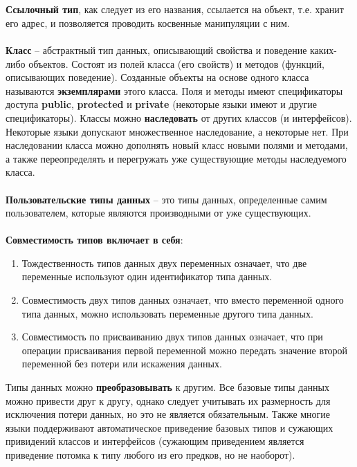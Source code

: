 \documentclass[a4paper, 12pt]{report}
\numberwithin{equation}{section}
\begin{document}
	\\\\
	\textbf{Ссылочный тип}, как следует из его названия, ссылается на объект, т.е. хранит его адрес, и позволяется проводить косвенные манипуляции с ним. 
	\\\\
	\textbf{Класс} -- абстрактный тип данных, описывающий свойства и поведение каких-либо объектов. Состоят из полей класса (его свойств) и методов (функций, описывающих поведение). Созданные объекты на основе одного класса называются \textbf{экземплярами} этого класса. Поля и методы имеют спецификаторы доступа \textbf{public}, \textbf{protected} и \textbf{private} (некоторые языки имеют и другие спецификаторы). Классы можно \textbf{наследовать} от других классов (и интерфейсов). Некоторые языки допускают множественное наследование, а некоторые нет. При наследовании класса можно дополнять новый класс новыми полями и методами, а также переопределять и перегружать уже существующие методы наследуемого класса.
	\\\\
	\textbf{Пользовательские типы данных} -- это типы данных, определенные самим пользователем, которые являются производными от уже существующих.
	\\\\
	\textbf{Совместимость типов включает в себя}:
	\begin{enumerate}
		\item Тождественность типов данных двух переменных означает, что две переменные используют один идентификатор типа данных.
		\item Совместимость двух типов данных означает, что вместо переменной одного типа данных, можно использовать переменные другого типа данных.
		\item Совместимость по присваиванию двух типов данных означает, что при операции присваивания первой переменной можно передать значение второй переменной без потери или искажения данных.
	\end{enumerate}
	Типы данных можно \textbf{преобразовывать} к другим. Все базовые типы данных можно привести друг к другу, однако следует учитывать их размерность для исключения потери данных, но это не является обязательным. Также многие языки поддерживают автоматическое приведение базовых типов и сужающих привидений классов и интерфейсов (сужающим приведением является приведение потомка к типу любого из его предков, но не наоборот).
	\\\\
\end{document}
